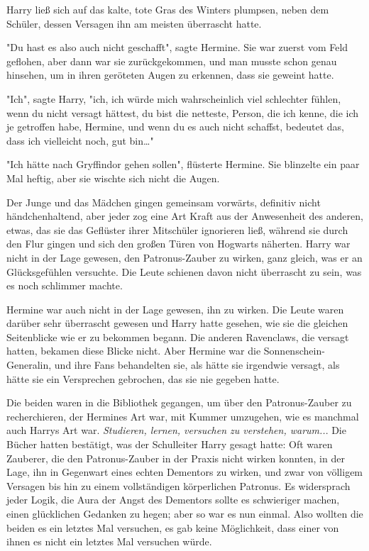 {Harry ließ sich auf das kalte, tote Gras des Winters plumpsen, neben dem Schüler, dessen Versagen ihn am meisten überrascht hatte.

"Du hast es also auch nicht geschafft", sagte Hermine. Sie war zuerst vom Feld geflohen, aber dann war sie zurückgekommen, und man musste schon genau hinsehen, um in ihren geröteten Augen zu erkennen, dass sie geweint hatte.

"Ich", sagte Harry, "ich, ich würde mich wahrscheinlich viel schlechter fühlen, wenn du nicht versagt hättest, du bist die netteste, Person, die ich kenne, die ich je getroffen habe, Hermine, und wenn du es auch nicht schaffst, bedeutet das, dass ich vielleicht noch, gut bin…"

"Ich hätte nach Gryffindor gehen sollen", flüsterte Hermine. Sie blinzelte ein paar Mal heftig, aber sie wischte sich nicht die Augen.

Der Junge und das Mädchen gingen gemeinsam vorwärts, definitiv nicht händchenhaltend, aber jeder zog eine Art Kraft aus der Anwesenheit des anderen, etwas, das sie das Geflüster ihrer Mitschüler ignorieren ließ, während sie durch den Flur gingen und sich den großen Türen von Hogwarts näherten. Harry war nicht in der Lage gewesen, den Patronus-Zauber zu wirken, ganz gleich, was er an Glücksgefühlen versuchte. Die Leute schienen davon nicht überrascht zu sein, was es noch schlimmer machte.

Hermine war auch nicht in der Lage gewesen, ihn zu wirken. Die Leute waren darüber sehr überrascht gewesen und Harry hatte gesehen, wie sie die gleichen Seitenblicke wie er zu bekommen begann. Die anderen Ravenclaws, die versagt hatten, bekamen diese Blicke nicht. Aber Hermine war die Sonnenschein-Generalin, und ihre Fans behandelten sie, als hätte sie irgendwie versagt, als hätte sie ein Versprechen gebrochen, das sie nie gegeben hatte.

Die beiden waren in die Bibliothek gegangen, um über den Patronus-Zauber zu recherchieren, der Hermines Art war, mit Kummer umzugehen, wie es manchmal auch Harrys Art war. \emph{Studieren, lernen, versuchen zu verstehen, warum..}. Die Bücher hatten bestätigt, was der Schulleiter Harry gesagt hatte: Oft waren Zauberer, die den Patronus-Zauber in der Praxis nicht wirken konnten, in der Lage, ihn in Gegenwart eines echten Dementors zu wirken, und zwar von völligem Versagen bis hin zu einem vollständigen körperlichen Patronus. Es widersprach jeder Logik, die Aura der Angst des Dementors sollte es schwieriger machen, einen glücklichen Gedanken zu hegen; aber so war es nun einmal. Also wollten die beiden es ein letztes Mal versuchen, es gab keine Möglichkeit, dass einer von ihnen es nicht ein letztes Mal versuchen würde.

}
